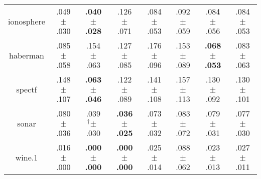 \begin{tabular}{|c|ccccccc|}
ionosphere & .049$^{\phantom{\dag}}\pm^{\phantom{\dag}}$.030\cellcolor{green!32} & \textbf{.040$^{\phantom{\dag}}\pm^{\phantom{\dag}}$.028}\cellcolor{green!40} & .126$^{\phantom{\dag}}\pm^{\phantom{\dag}}$.071\cellcolor{red!40} & .084$^{\phantom{\dag}}\pm^{\phantom{\dag}}$.053\cellcolor{red!0} & .092$^{\phantom{\dag}}\pm^{\phantom{\dag}}$.059\cellcolor{red!8} & .084$^{\phantom{\dag}}\pm^{\phantom{\dag}}$.056\cellcolor{red!0} & .084$^{\phantom{\dag}}\pm^{\phantom{\dag}}$.053\cellcolor{red!1} \\
haberman & .085$^{\phantom{\dag}}\pm^{\phantom{\dag}}$.058\cellcolor{green!27} & .154$^{\phantom{\dag}}\pm^{\phantom{\dag}}$.063\cellcolor{red!23} & .127$^{\phantom{\dag}}\pm^{\phantom{\dag}}$.085\cellcolor{red!3} & .176$^{\phantom{\dag}}\pm^{\phantom{\dag}}$.096\cellcolor{red!40} & .153$^{\phantom{\dag}}\pm^{\phantom{\dag}}$.089\cellcolor{red!22} & \textbf{.068$^{\phantom{\dag}}\pm^{\phantom{\dag}}$.053}\cellcolor{green!40} & .083$^{\phantom{\dag}}\pm^{\phantom{\dag}}$.063\cellcolor{green!29} \\
spectf & .148$^{\phantom{\dag}}\pm^{\phantom{\dag}}$.107\cellcolor{red!32} & \textbf{.063$^{\phantom{\dag}}\pm^{\phantom{\dag}}$.046}\cellcolor{green!40} & .122$^{\phantom{\dag}}\pm^{\phantom{\dag}}$.089\cellcolor{red!9} & .141$^{\phantom{\dag}}\pm^{\phantom{\dag}}$.108\cellcolor{red!26} & .157$^{\phantom{\dag}}\pm^{\phantom{\dag}}$.113\cellcolor{red!40} & .130$^{\phantom{\dag}}\pm^{\phantom{\dag}}$.092\cellcolor{red!16} & .130$^{\phantom{\dag}}\pm^{\phantom{\dag}}$.101\cellcolor{red!16} \\
sonar & .080$^{\phantom{\dag}}\pm^{\phantom{\dag}}$.036\cellcolor{red!35} & .039$^{\dag}\pm^{\phantom{\dag}}$.030\cellcolor{green!36} & \textbf{.036$^{\phantom{\dag}}\pm^{\phantom{\dag}}$.025}\cellcolor{green!40} & .073$^{\phantom{\dag}}\pm^{\phantom{\dag}}$.032\cellcolor{red!22} & .083$^{\phantom{\dag}}\pm^{\phantom{\dag}}$.072\cellcolor{red!40} & .079$^{\phantom{\dag}}\pm^{\phantom{\dag}}$.031\cellcolor{red!33} & .077$^{\phantom{\dag}}\pm^{\phantom{\dag}}$.030\cellcolor{red!30} \\
wine.1 & .016$^{\phantom{\dag}}\pm^{\phantom{\dag}}$.000\cellcolor{green!25} & \textbf{.000$^{\phantom{\dag}}\pm^{\phantom{\dag}}$.000}\cellcolor{green!40} & \textbf{.000$^{\phantom{\dag}}\pm^{\phantom{\dag}}$.000}\cellcolor{green!40} & .025$^{\phantom{\dag}}\pm^{\phantom{\dag}}$.014\cellcolor{green!16} & .088$^{\phantom{\dag}}\pm^{\phantom{\dag}}$.062\cellcolor{red!40} & .023$^{\phantom{\dag}}\pm^{\phantom{\dag}}$.013\cellcolor{green!19} & .027$^{\phantom{\dag}}\pm^{\phantom{\dag}}$.011\cellcolor{green!15} \\

\end{tabular}
